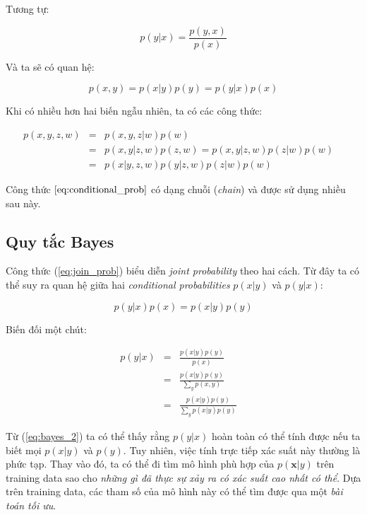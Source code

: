 \documentclass[../main-report.tex]{subfiles}
\begin{document}
Tương tự:

\begin{equation}
  p(y | x) = \frac{p(y, x)}{p(x)}
\end{equation}

Và ta sẽ có quan hệ:

\begin{equation} \label{eq:join_prob}
  p(x, y) = p(x | y)p(y) = p(y | x)p(x)
\end{equation}

Khi có nhiều hơn hai biến ngẫu nhiên, ta có các công thức:


\begin{eqnarray}
  p(x, y, z, w)
  & = & p(x, y, z | w) p(w) \\
  & = & p(x, y | z, w)p(z, w) = p(x, y | z, w) p(z | w) p(w) \quad \\
  & = & p(x | y, z, w)p(y | z, w)p(z | w) p(w) \label{eq:conditional_prob}
\end{eqnarray}

Công thức \(\ref{eq:conditional_prob}\) có dạng chuỗi (\textit{chain}) và được sử dụng nhiều sau này.

\subsection{Quy tắc Bayes}
Công thức (\ref{eq:join_prob}) biểu diễn \textit{joint probability} theo hai cách. Từ đây ta có thể suy ra quan hệ giữa hai \textit{conditional probabilities} \(p(x |y)\) và \(p(y | x)\):

\[
  p(y | x) p(x) = p(x | y) p(y)
\]

Biến đối một chút:


\begin{eqnarray}
  p(y | x)
  & = & \frac{p(x | y) p(y)}{p(x)} \label{eq:bayes_1} \\
  & = & \frac{p(x | y) p(y)}{\sum_{y} p(x, y)} \\
  & = & \frac{p(x |y) p(y)}{\sum_{y} p(x | y) p(y)} \quad \label{eq:bayes_2}
\end{eqnarray}

Từ (\ref{eq:bayes_2}) ta có thể thấy rằng \(p(y | x)\) hoàn toàn có thể tính được nếu ta biết mọi \(p(x | y)\) và \(p(y)\). Tuy nhiên, việc tính trực tiếp xác suất này thường là phức tạp. Thay vào đó, ta có thể đi tìm mô hình phù hợp của \(p(\mathbf{x} | y)\) trên training data sao cho \textit{những gì đã thực sự xảy ra có xác suất cao nhất có thể}. Dựa trên training data, các tham số của mô hình này có thể tìm được qua một \textit{bài toán tối ưu}.
\end{document}
